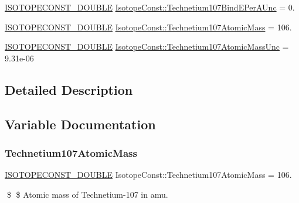 \begin{DoxyCompactItemize}
\item 
\mbox{\hyperlink{group___isotope_const-_macros_ga8f45a7272ce02c0b4c65c44636ed719a}{I\+S\+O\+T\+O\+P\+E\+C\+O\+N\+S\+T\+\_\+\+D\+O\+U\+B\+LE}} \mbox{\hyperlink{group___isotope_const-_technetium-_tc107_ga6e008587c7036d736d6441a3d0c7beea}{Isotope\+Const\+::\+Technetium107\+Bind\+E\+Per\+A\+Unc}} = 0.
\item 
\mbox{\hyperlink{group___isotope_const-_macros_ga8f45a7272ce02c0b4c65c44636ed719a}{I\+S\+O\+T\+O\+P\+E\+C\+O\+N\+S\+T\+\_\+\+D\+O\+U\+B\+LE}} \mbox{\hyperlink{group___isotope_const-_technetium-_tc107_ga2efb38c2dd39754cdcd160eaf01f4ecf}{Isotope\+Const\+::\+Technetium107\+Atomic\+Mass}} = 106.
\item 
\mbox{\hyperlink{group___isotope_const-_macros_ga8f45a7272ce02c0b4c65c44636ed719a}{I\+S\+O\+T\+O\+P\+E\+C\+O\+N\+S\+T\+\_\+\+D\+O\+U\+B\+LE}} \mbox{\hyperlink{group___isotope_const-_technetium-_tc107_ga07745b30f333509a3d6d2f339c167346}{Isotope\+Const\+::\+Technetium107\+Atomic\+Mass\+Unc}} = 9.\+31e-\/06
\end{DoxyCompactItemize}


\subsection{Detailed Description}


\subsection{Variable Documentation}
\mbox{\label{group___isotope_const-_technetium-_tc107_ga2efb38c2dd39754cdcd160eaf01f4ecf}} 
\subsubsection{\texorpdfstring{Technetium107\+Atomic\+Mass}{Technetium107AtomicMass}}
{\footnotesize\ttfamily \mbox{\hyperlink{group___isotope_const-_macros_ga8f45a7272ce02c0b4c65c44636ed719a}{I\+S\+O\+T\+O\+P\+E\+C\+O\+N\+S\+T\+\_\+\+D\+O\+U\+B\+LE}} Isotope\+Const\+::\+Technetium107\+Atomic\+Mass = 106.}

\$ \$ Atomic mass of Technetium-\/107 in amu. \mbox{\label{group___isotope_const-_technetium-_tc107_ga07745b30f333509a3d6d2f339c167346}} 

